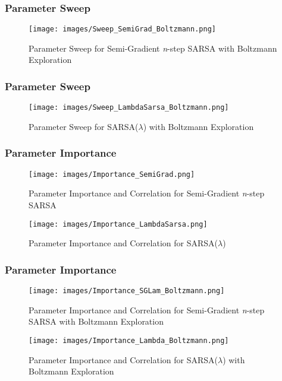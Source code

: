 \documentclass{beamer}
\begin{document}
\begin{frame}
    \frametitle{Parameter Sweep}
    \begin{figure}
        \texttt{[image: images/Sweep\_SemiGrad\_Boltzmann.png]}
        \caption{Parameter Sweep for Semi-Gradient \emph{n}-step SARSA with Boltzmann Exploration}
        \label{fig:SemiGrad_SARSA_Boltzmann_Sweep}
    \end{figure}
\end{frame}

\begin{frame}
    \frametitle{Parameter Sweep}
    \begin{figure}
        \texttt{[image: images/Sweep\_LambdaSarsa\_Boltzmann.png]}
        \caption{Parameter Sweep for SARSA(\(\lambda\)) with Boltzmann Exploration}
        \label{fig:SARSA_Lambda_Boltzmann_Sweep}
    \end{figure}
\end{frame}

\begin{frame}
    \frametitle{Parameter Importance}
    \begin{multicols}{2}
        \begin{figure}
            \texttt{[image: images/Importance\_SemiGrad.png]}
            \caption{Parameter Importance and Correlation for Semi-Gradient \emph{n}-step SARSA}
            \label{fig:SemiGrad_SARSA_Importance}
          \end{figure}
          \begin{figure}
            \texttt{[image: images/Importance\_LambdaSarsa.png]}
            \caption{Parameter Importance and Correlation for SARSA(\(\lambda\))}
            \label{fig:SARSA_Lambda_Importance}
          \end{figure}
    \end{multicols}
\end{frame}

\begin{frame}
    \frametitle{Parameter Importance}
    \begin{multicols}{2}
          \begin{figure}
            \texttt{[image: images/Importance\_SGLam\_Boltzmann.png]}
            \caption{Parameter Importance and Correlation for Semi-Gradient \emph{n}-step 
            SARSA with Boltzmann Exploration}
            \label{fig:SemiGrad_SARSA_Boltz_Importance}
          \end{figure}
          \begin{figure}
            \texttt{[image: images/Importance\_Lambda\_Boltzmann.png]}
            \caption{Parameter Importance and Correlation for SARSA(\(\lambda\)) with Boltzmann Exploration}
            \label{fig:SARSA_Lambda_Boltz_Importance}
          \end{figure}
    \end{multicols}
\end{frame}
\end{document}
